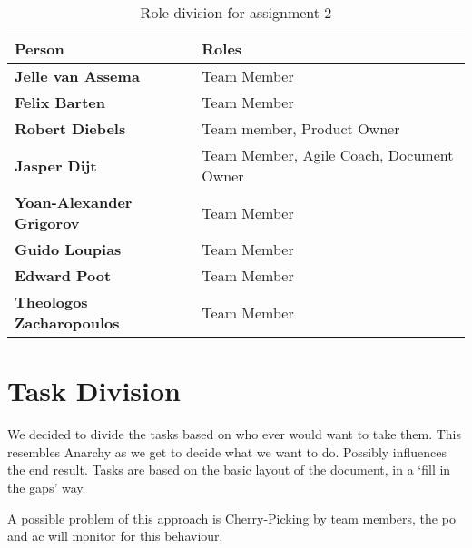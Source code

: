 \begin{table}[!ht]
    \centering
    \begin{tabular}{>{\bfseries}l l}
    Person                      & Roles\\
    \midrule
    Jelle van Assema            & Team Member                   \\ 
    Felix Barten                & Team Member                   \\
    Robert Diebels              & Team member, Product Owner                 \\   
    Jasper Dijt                 & Team Member, Agile Coach, Document Owner   \\
    Yoan-Alexander Grigorov     & Team Member                   \\
    Guido Loupias               & Team Member                   \\
    Edward Poot                 & Team Member                   \\
    Theologos Zacharopoulos     & Team Member                   \\
    \end{tabular}
    \caption{Role division for assignment 2}
    \label{tab:roles}
\end{table}

%

\section{Task Division}
We decided to divide the tasks based on who ever would want to take them. This resembles Anarchy as we get to decide what we want to do. Possibly influences the end result.
Tasks are based on the basic layout of the document, in a `fill in the gaps' way.

A possible problem of this approach is Cherry-Picking by team members, the \ac{po} and \ac{ac} will monitor for this behaviour.

